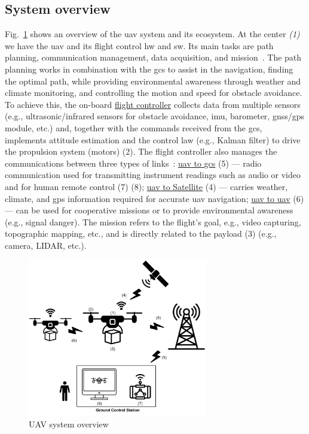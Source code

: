 \subsection{System overview}%
\label{sec:system-overview}
Fig.~\ref{fig:uav-sysOverv} shows an overview of the \gls{uav} system and its
ecosystem. At the center \emph{(1)} we have the \gls{uav} and its flight control
\gls{hw} and \gls{sw}. Its main tasks are path planning, communication
management, data acquisition, and mission~\cite{aggarwal2020UAVPathPlanning}. The path planning works in
combination with the \gls{gcs} to assist in the navigation, finding the optimal
path, while providing environmental awareness through weather and climate
monitoring, and controlling the motion and speed for obstacle avoidance. To
achieve this, the
on-board \underline{flight controller} collects data from multiple sensors
(e.g., ultrasonic/infrared sensors for obstacle avoidance,
\gls{imu}, barometer, \gls{gnss}/\gls{gps} module, etc.) and,
together with the commands received from the \gls{gcs}, implements attitude
estimation and the control law (e.g., Kalman filter) to drive the propulsion
system (motors) (2). The flight controller also manages the communications
between three types of links~\cite{aggarwal2020UAVPathPlanning}: \underline{\gls{uav} to \gls{gcs}} (5) --- radio
communication used for transmitting instrument readings such as audio or video
and for human remote control (7) (8); \underline{\gls{uav}
  to Satellite} (4) --- carries weather, climate, and \gls{gps} information
  required for accurate \gls{uav} navigation; \underline{\gls{uav} to \gls{uav}}
  (6) --- can be used for cooperative missions or to provide environmental
  awareness (e.g., signal danger). The mission refers to the flight's goal,
  e.g., video capturing, topographic mapping, etc., and is directly related to
  the payload (3) (e.g., camera, LIDAR, etc.).

\begin{figure}[!hbt]
  \centering
  \includegraphics[width=0.7\textwidth]{./img/pdf/uav-sys-overv.pdf} 
%   
  \caption{UAV system overview}%
  \label{fig:uav-sysOverv}
\end{figure}


